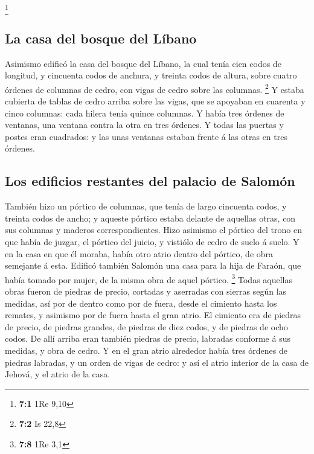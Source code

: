 \footnote{\textbf{7:1} 1Re 9,10}

\hypertarget{la-casa-del-bosque-del-luxedbano}{%
\subsection{La casa del bosque del
Líbano}\label{la-casa-del-bosque-del-luxedbano}}

 Asimismo edificó la casa del bosque del Líbano, la cual
tenía cien codos de longitud, y cincuenta codos de anchura, y treinta
codos de altura, sobre cuatro órdenes de columnas de cedro, con vigas de
cedro sobre las columnas. \footnote{\textbf{7:2} Is 22,8}  Y
estaba cubierta de tablas de cedro arriba sobre las vigas, que se
apoyaban en cuarenta y cinco columnas: cada hilera tenía quince
columnas.  Y había tres órdenes de ventanas, una ventana
contra la otra en tres órdenes.  Y todas las puertas y
postes eran cuadrados: y las unas ventanas estaban frente á las otras en
tres órdenes.

\hypertarget{los-edificios-restantes-del-palacio-de-salomuxf3n}{%
\subsection{Los edificios restantes del palacio de
Salomón}\label{los-edificios-restantes-del-palacio-de-salomuxf3n}}

 También hizo un pórtico de columnas, que tenía de largo
cincuenta codos, y treinta codos de ancho; y aqueste pórtico estaba
delante de aquellas otras, con sus columnas y maderos correspondientes.
 Hizo asimismo el pórtico del trono en que había de juzgar,
el pórtico del juicio, y vistiólo de cedro de suelo á suelo.
 Y en la casa en que él moraba, había otro atrio dentro del
pórtico, de obra semejante á esta. Edificó también Salomón una casa para
la hija de Faraón, que había tomado por mujer, de la misma obra de aquel
pórtico. \footnote{\textbf{7:8} 1Re 3,1}  Todas aquellas
obras fueron de piedras de precio, cortadas y aserradas con sierras
según las medidas, así por de dentro como por de fuera, desde el
cimiento hasta los remates, y asimismo por de fuera hasta el gran atrio.
 El cimiento era de piedras de precio, de piedras grandes,
de piedras de diez codos, y de piedras de ocho codos.  De
allí arriba eran también piedras de precio, labradas conforme á sus
medidas, y obra de cedro.  Y en el gran atrio alrededor
había tres órdenes de piedras labradas, y un orden de vigas de cedro: y
así el atrio interior de la casa de Jehová, y el atrio de la casa.

